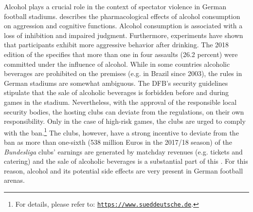 Alcohol plays a crucial role in the context of spectator violence in German football stadiums. \cite{cook2013virtuous} describes the pharmacological effects of alcohol consumption on aggression and cognitive functions. Alcohol consumption is associated with a loss of inhibition and impaired judgment. Furthermore, experiments have shown that participants exhibit more aggressive behavior after drinking. The 2018 edition of the \citeauthor{PCS2018} specifies that more than one in four assaults (26.2 percent) were committed under the influence of alcohol. While in some countries alcoholic beverages are prohibited on the premises (e.g. in Brazil since 2003), the rules in German stadiums are somewhat ambiguous. The DFB's security guidelines stipulate that the sale of alcoholic beverages is forbidden before and during games in the stadium. Nevertheless, with the approval of the responsible local security bodies, the hosting clubs can deviate from the regulations, on their own responsibility. Only in the case of high-risk games, the clubs are urged to comply with the ban.\footnote{For details, please refer to: \href{https://www.sueddeutsche.de/sport/fussball-alkohol-in-stadien-nur-mit-ausdruecklicher-einwilligung-dpa.urn-newsml-dpa-com-20090101-150625-99-01743}{\texttt{https://www.sueddeutsche.de}}.} The clubs, however, have a strong incentive to deviate from the ban as more than one-sixth (538 million Euros in the 2017/18 season) of the \textit{Bundesliga} clubs' earnings are generated by matchday revenues (e.g. tickets and catering) and the sale of alcoholic beverages is a substantial part of this \citep{deloitte2019report}. For this reason, alcohol and its potential side effects are very present in German football arenas.


